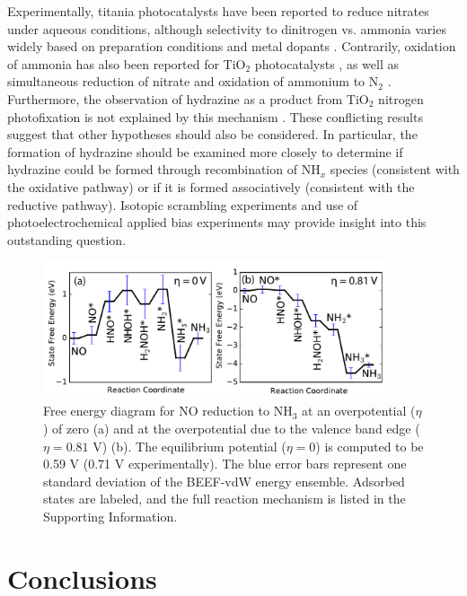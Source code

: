 \documentclass[journal=ascecg,manuscript=article,articletitle=true]{achemso}
\begin{document}
Experimentally, titania photocatalysts have been reported to reduce nitrates under aqueous conditions, although selectivity to dinitrogen vs. ammonia varies widely based on preparation conditions and metal dopants \cite{Kobwittaya_2014, Kominami_2010, Ranjit_1997,Shand_2013,Xie_2017,Lozovskii_2009}. Contrarily, oxidation of ammonia has also been reported for TiO$_2$ photocatalysts \cite{Pollema_1992, Wang_1994, Kominami_2014}, as well as simultaneous reduction of nitrate and oxidation of ammonium to N$_2$ \cite{Kominami_2014}. Furthermore, the observation of hydrazine as a product from TiO$_2$ nitrogen photofixation is not explained by this mechanism \cite{Schrauzer_2011}. These conflicting results suggest that other hypotheses should also be considered. In particular, the formation of hydrazine should be examined more closely to determine if hydrazine could be formed through recombination of NH$_x$ species (consistent with the oxidative pathway) or if it is formed associatively (consistent with the reductive pathway). Isotopic scrambling experiments\cite{Urabe_1978} and use of photoelectrochemical applied bias experiments may provide insight into this outstanding question.

\begin{figure}
\includegraphics[width=0.9\textwidth]{figures/NO_reduction_FED.pdf}
\caption{Free energy diagram for NO reduction to NH$_3$ at an overpotential ($\eta$) of zero (a) and at the overpotential due to the valence band edge ($\eta=0.81$ V) (b). The equilibrium potential ($\eta=0$) is computed to be 0.59 V (0.71 V experimentally). The blue error bars represent one standard deviation of the BEEF-vdW energy ensemble. Adsorbed states are labeled, and the full reaction mechanism is listed in the Supporting Information.}
\label{fig:FED_oxid_red}
\end{figure}


\section{Conclusions}
\end{document}
